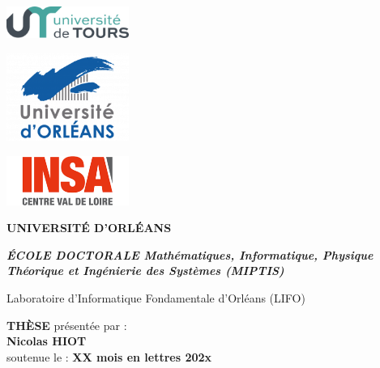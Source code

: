 \thispagestyle{empty}

{\setlength{\parindent}{0cm}

\begin{sffamily}

\begin{minipage}{1cm}
\includegraphics[width=4cm]{logos/logoTours.png} 
\end{minipage}
\hfill
\begin{minipage}{1cm}
\includegraphics[width=4cm]{logos/logoOrleans2022.png} 
\end{minipage}
\hfill
\begin{minipage}{3cm}
\includegraphics[width=4cm]{logos/logoINSA.png} 
\end{minipage}

\vspace{0.5cm}
\begin{minipage}{15.5cm}
\centering
\LARGE\textbf{UNIVERSITÉ D'ORLÉANS}
\end{minipage}
\hfill

\vspace{0.3cm}

\begin{minipage}{\textwidth}
\centering
\Large\textit{\textbf{ÉCOLE DOCTORALE Mathématiques, Informatique, Physique Théorique et Ingénierie des Systèmes (MIPTIS)}}

Laboratoire d'Informatique Fondamentale d'Orléans (LIFO)
\end{minipage}

\vspace{0.3cm}

\begin{minipage}{\textwidth}
\centering\LARGE
\textbf{THÈSE} \normalsize présentée par : \\
\vspace{0.3cm}
\LARGE\textbf{Nicolas HIOT}\\
\vspace{0.3cm}
soutenue le : \textbf{XX mois en lettres 202x}
\end{minipage}
	

\end{sffamily}}
